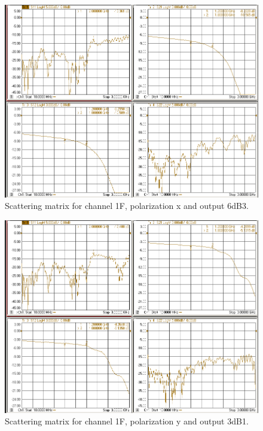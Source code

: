 \documentclass[12pt,a4paper,oneside]{article}
\begin{document}
\begin{figure}[H]
\centering
\includegraphics[width=0.9\linewidth]{VNA_results/1Fx_6dB3.png}
\caption{Scattering matrix for channel 1F, polarization x and output 6dB3.}
\label{fig:1Fx_6dB3}
\end{figure}


\begin{figure}[H]
\centering
\includegraphics[width=0.9\linewidth]{VNA_results/1Fy_3dB1.png}
\caption{Scattering matrix for channel 1F, polarization y and output 3dB1.}
\label{fig:1Fy_3dB1}
\end{figure}
\end{document}
